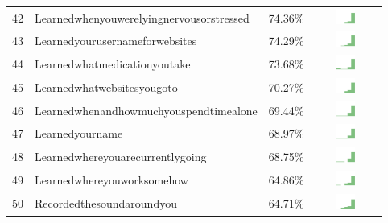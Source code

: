 \documentclass[a4paper,12pt]{article}
\begin{document}
\begin{longtable}{| p{0.5cm} | p{7cm} | p{1cm} | c |}
42 & Learnedwhenyouwerelyingnervousorstressed & 74.36\% & \includegraphics[width = 2cm, height = 0.5cm]{learnedwhenyouwerelyingnervousorstressedPUBLIC} \\  
43 & Learnedyourusernameforwebsites & 74.29\% & \includegraphics[width = 2cm, height = 0.5cm]{learnedyourusernameforwebsitesPUBLIC} \\  
44 & Learnedwhatmedicationyoutake & 73.68\% & \includegraphics[width = 2cm, height = 0.5cm]{learnedwhatmedicationyoutakePUBLIC} \\  
45 & Learnedwhatwebsitesyougoto & 70.27\% & \includegraphics[width = 2cm, height = 0.5cm]{learnedwhatwebsitesyougotoPUBLIC} \\  
46 & Learnedwhenandhowmuchyouspendtimealone & 69.44\% & \includegraphics[width = 2cm, height = 0.5cm]{learnedwhenandhowmuchyouspendtimealonePUBLIC} \\  
47 & Learnedyourname & 68.97\% & \includegraphics[width = 2cm, height = 0.5cm]{learnedyournamePUBLIC} \\  
48 & Learnedwhereyouarecurrentlygoing & 68.75\% & \includegraphics[width = 2cm, height = 0.5cm]{learnedwhereyouarecurrentlygoingPUBLIC} \\  
49 & Learnedwhereyouworksomehow & 64.86\% & \includegraphics[width = 2cm, height = 0.5cm]{learnedwhereyouworksomehowPUBLIC} \\  
50 & Recordedthesoundaroundyou & 64.71\% & \includegraphics[width = 2cm, height = 0.5cm]{recordedthesoundaroundyouPUBLIC} \\  

\end{longtable}
\end{document}
